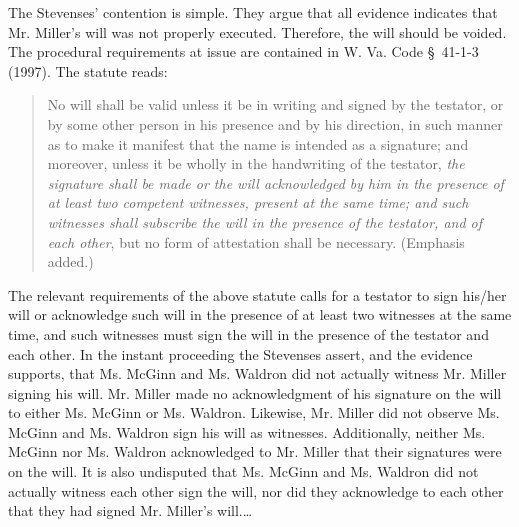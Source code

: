 The Stevenses' contention is simple. They argue that all evidence indicates that
Mr. Miller's will was not properly executed. Therefore, the will should be
voided. The procedural requirements at issue are contained in W. Va. Code
{\S}~41-1-3 (1997). The statute reads: 
\begin{quote}
No will shall be valid unless it be in writing and signed by the testator, or by
some other person in his presence and by his direction, in such manner as to
make it manifest that the name is intended as a signature; and moreover, unless
it be wholly in the handwriting of the testator, \textit{the signature shall be
made or the will acknowledged by him in the presence of at least two competent
witnesses, present at the same time; and such witnesses shall subscribe the
will in the presence of the testator, and of each other}, but no form of
attestation shall be necessary. (Emphasis added.) 
\end{quote}
The relevant requirements of the above statute calls for a testator to sign
his/her will or acknowledge such will in the presence of at least two witnesses
at the same time, and such witnesses must sign the will in the presence of the
testator and each other. In the instant proceeding the Stevenses assert, and
the evidence supports, that Ms. McGinn and Ms. Waldron did not actually witness
Mr. Miller signing his will. Mr. Miller made no acknowledgment of his signature
on the will to either Ms. McGinn or Ms. Waldron. Likewise, Mr. Miller did not
observe Ms. McGinn and Ms. Waldron sign his will as witnesses. Additionally,
neither Ms. McGinn nor Ms. Waldron acknowledged to Mr. Miller that their
signatures were on the will. It is also undisputed that Ms. McGinn and Ms.
Waldron did not actually witness each other sign the will, nor did they
acknowledge to each other that they had signed Mr. Miller's will.\ldots

